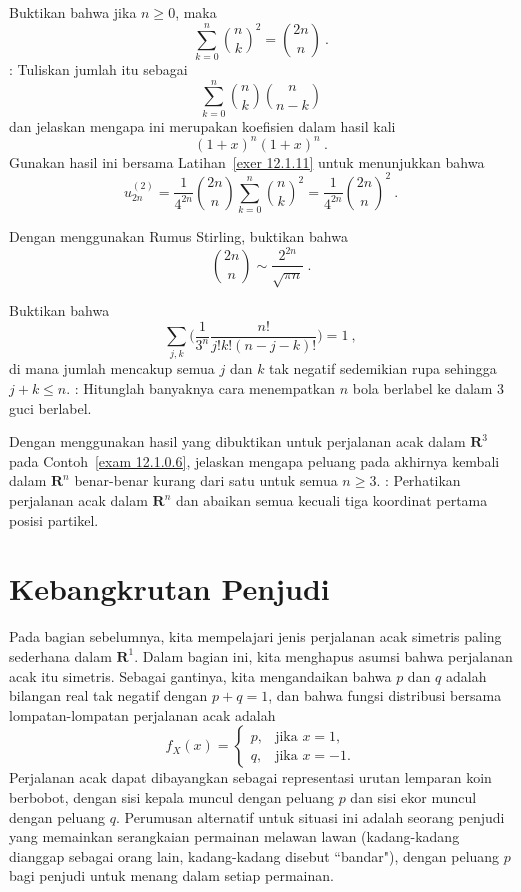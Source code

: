 \begin{LJSItem}
\item\label{exer 12.1.12}
Buktikan bahwa jika $n \ge 0$, maka
$$\sum_{k = 0}^n {n \choose k}^2 = {{2n} \choose n}\ .$$
: Tuliskan jumlah itu sebagai 
$$\sum_{k = 0}^n {n \choose k}{n \choose {n-k}}$$
dan jelaskan mengapa ini merupakan koefisien dalam hasil kali
$$(1 + x)^n (1 + x)^n\ .$$
Gunakan hasil ini bersama Latihan~\ref{exer 12.1.11} untuk menunjukkan bahwa
$$u^{(2)}_{2n} = \frac 1{4^{2n}}{{2n}\choose n}\sum_{k = 0}^n {n \choose k}^2 = 
\frac 1 {4^{2n}} {{2n}\choose n}^2\ .$$

\item\label{exer 12.1.13}
Dengan menggunakan Rumus Stirling, buktikan bahwa
$${{2n}\choose n} \sim \frac {2^{2n}}{\sqrt {\pi n}}\ .$$

\item\label{exer 12.1.14}
Buktikan bahwa
$$\sum_{j,k} 
\biggl(\frac 1{3^n}\frac{n!}{j!k!(n-j-k)!}\biggr) = 1\ ,$$
di mana jumlah mencakup semua $j$ dan $k$ tak negatif sedemikian rupa sehingga
$j + k \le n$. : Hitunglah banyaknya cara menempatkan $n$ bola
berlabel ke dalam 3 guci berlabel.

\item\label{exer 12.1.15}
Dengan menggunakan hasil yang dibuktikan untuk perjalanan acak dalam
${\mathbf R}^3$ pada Contoh~\ref{exam 12.1.0.6}, jelaskan mengapa peluang pada
akhirnya kembali dalam ${\mathbf R}^n$ benar-benar kurang dari satu untuk
semua $n \ge 3$. : Perhatikan perjalanan acak dalam
${\mathbf R}^n$ dan abaikan semua kecuali tiga koordinat pertama posisi partikel.

\end{LJSItem}

\section{Kebangkrutan Penjudi\label{sec 12.2}}
\par
Pada bagian sebelumnya, kita mempelajari jenis perjalanan acak simetris paling
sederhana dalam ${\mathbf R}^1$. Dalam bagian ini, kita menghapus asumsi bahwa
perjalanan acak itu simetris. Sebagai gantinya, kita mengandaikan bahwa $p$ dan
$q$ adalah bilangan real tak negatif dengan $p+q = 1$, dan bahwa fungsi
distribusi bersama lompatan-lompatan perjalanan acak adalah
$$f_X(x) = \left \{ \begin{array}{ll}
               p, & \mbox{jika $x = 1$},\\ 
               q, & \mbox{jika $x = -1$}.
                      \end{array}
             \right.   
$$ 
Perjalanan acak dapat dibayangkan sebagai representasi urutan lemparan koin
berbobot, dengan sisi kepala muncul dengan peluang $p$ dan sisi ekor muncul
dengan peluang $q$. Perumusan alternatif untuk situasi ini adalah seorang
penjudi yang memainkan serangkaian permainan melawan lawan (kadang-kadang
dianggap sebagai orang lain, kadang-kadang disebut ``bandar"), dengan peluang
$p$ bagi penjudi untuk menang dalam setiap permainan.

